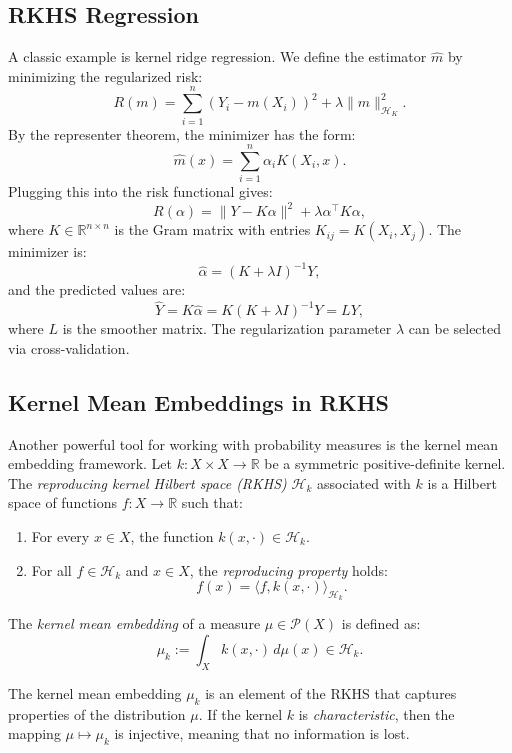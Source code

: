 \documentclass[twoside,11pt]{article}
\begin{document}
\subsection{RKHS Regression}

A classic example is kernel ridge regression. We define the estimator \( \hat{m} \) by minimizing the regularized risk:
\[
R(m) = \sum_{i=1}^n (Y_i - m(X_i))^2 + \lambda \|m\|_{\mathcal{H}_K}^2.
\]
By the representer theorem, the minimizer has the form:
\[
\hat{m}(x) = \sum_{i=1}^n \alpha_i K(X_i, x).
\]
Plugging this into the risk functional gives:
\[
R(\alpha) = \|Y - K\alpha\|^2 + \lambda \alpha^\top K \alpha,
\]
where \( K \in \mathbb{R}^{n \times n} \) is the Gram matrix with entries \( K_{ij} = K(X_i, X_j) \). The minimizer is:
\[
\hat{\alpha} = (K + \lambda I)^{-1} Y,
\]
and the predicted values are:
\[
\hat{Y} = K \hat{\alpha} = K(K + \lambda I)^{-1} Y = L Y,
\]
where \( L \) is the smoother matrix. The regularization parameter \( \lambda \) can be selected via cross-validation.


\subsection{Kernel Mean Embeddings in RKHS}

Another powerful tool for working with probability measures is the kernel mean embedding framework. Let $k: X \times X \to \mathbb{R}$ be a symmetric positive-definite kernel. The \emph{reproducing kernel Hilbert space (RKHS)} $\mathcal{H}_k$ associated with $k$ is a Hilbert space of functions $f: X \to \mathbb{R}$ such that:
\begin{enumerate}
  \item For every $x \in X$, the function $k(x, \cdot) \in \mathcal{H}_k$.
  \item For all $f \in \mathcal{H}_k$ and $x \in X$, the \emph{reproducing property} holds:
  \begin{equation}
    f(x) = \langle f, k(x, \cdot) \rangle_{\mathcal{H}_k}.
  \end{equation}
\end{enumerate}

The \emph{kernel mean embedding} of a measure $\mu \in \mathcal{P}(X)$ is defined as:
\begin{equation}
\mu_k := \int_X k(x, \cdot) \, d\mu(x) \in \mathcal{H}_k.
\end{equation}

The kernel mean embedding $\mu_k$ is an element of the RKHS that captures properties of the distribution $\mu$. If the kernel $k$ is \emph{characteristic}, then the mapping $\mu \mapsto \mu_k$ is injective, meaning that no information is lost.
\end{document}
